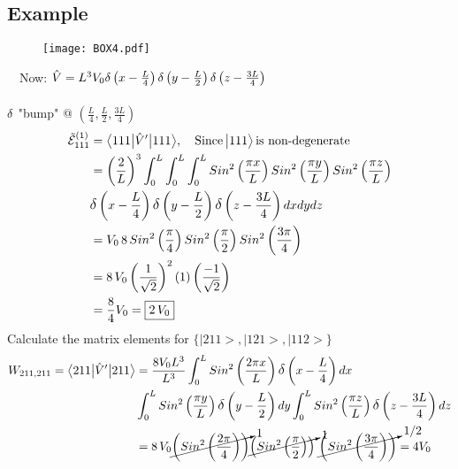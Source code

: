 \documentclass[12pt,fancychapters]{report}
\numberwithin{equation}{section}
\begin{document}
\subsection*{Example}
\begin{wrapfigure}[5]{l}{7cm}
  \begin{center}
\texttt{[image: BOX4.pdf]}
  \end{center}
\end{wrapfigure}
\
\
Now: $\hat{V} = L^3V_0 \mathlarger{\delta}\left(x-\frac{L}{4}\right)
\mathlarger{\delta}\left(y-\frac{L}{2}\right)
\mathlarger{\delta}\left(z-\frac{3L}{4}\right)$\\
\\
$\mathlarger{\delta}$ "bump" @ $\left(\frac{L}{4}, \frac{L}{2}, \frac{3L}{4}\right)$
\begin{align*}
  \tilde{\mathcal{E}}_{111}^{(1)} &= \big<111\big|\hat{V}'\big|111 \big>, \quad \text{Since}\,
  \big|111\big>\, \text{is non-degenerate}\\
  &= \left(\frac{2}{L}\right)^3\int_{0}^{L}\int_{0}^{L}
  \int_{0}^{L}Sin^2\left(\frac{\pi x}{L}\right)Sin^2\left(\frac{\pi y}{L}\right)Sin^2
  \left(\frac{\pi z}{L}\right)\\
   &\mathlarger{\delta}\left(x-\frac{L}{4}\right)
\mathlarger{\delta}\left(y-\frac{L}{2}\right)
\mathlarger{\delta}\left(z-\frac{3L}{4}\right)dxdydz\\
&= V_0\,8\,Sin^2\left(\frac{\pi}{4}\right)Sin^2\left(\frac{\pi}{2}\right)
Sin^2\left(\frac{3\pi}{4}\right)\\
&= 8\,V_0\left(\frac{1}{\sqrt{2}}\right)^2 (1) \left(\frac{-1}{\sqrt{2}}\right)\\
&= \frac{8}{4}V_0 = \boxed{2\,V_0}
\end{align*}
Calculate the matrix elements for $\{\big|211\big>, \big|121\big>, \big|112\big> \}$
\begin{align*}
  W_{211,211} =\big<211\big|\hat{V}'\big|211 \big> &= \frac{8V_0L^3}{L^3}\int_{0}^{L}
  Sin^2\left(\frac{2\pi x}{L}\right)\mathlarger{\delta}\left(x-\frac{L}{4}\right)dx\\
  &\int_{0}^{L}
  Sin^2\left(\frac{\pi y}{L}\right)\mathlarger{\delta}\left(y-\frac{L}{2}\right)dy
  \int_{0}^{L}
  Sin^2\left(\frac{\pi z}{L}\right)\mathlarger{\delta}\left(z-\frac{3L}{4}\right)dz\\
  &= 8\,V_0\cancelto{1}{\left(Sin^2\left(\frac{2\pi}{4}\right)\right)}
  \cancelto{1}{\left(Sin^2\left(\frac{\pi}{2}\right)\right)}\,\,
  \cancelto{1/2}{\left(Sin^2\left(\frac{3\pi}{4}\right)\right)} = 4V_0
\end{align*}
\end{document}
